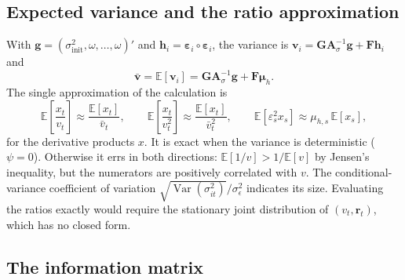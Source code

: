 \documentclass[12pt]{article}
\begin{document}
\subsection{Expected variance and the ratio approximation}\label{sec:ratio-approx}
With $\mathbf g=(\sigma^2_{\mathrm{init}},\omega,\dots,\omega)'$ and $\mathbf h_i=\boldsymbol\varepsilon_i\circ\boldsymbol\varepsilon_i$, the variance is $\mathbf v_i=\mathbf{GA}_\sigma^{-1}\mathbf g+\mathbf F\mathbf h_i$ and
\begin{equation}
\bar{\mathbf v}=\mathbb E[\mathbf v_i]=\mathbf{GA}_\sigma^{-1}\mathbf g+\mathbf F\boldsymbol\mu_h.
\end{equation}
The single approximation of the calculation is
\begin{equation}
\mathbb E\!\left[\frac{x_t}{v_t}\right]\approx\frac{\mathbb E[x_t]}{\bar v_t},\qquad
\mathbb E\!\left[\frac{x_t}{v_t^2}\right]\approx\frac{\mathbb E[x_t]}{\bar v_t^2},\qquad
\mathbb E\!\left[\varepsilon_s^2 x_s\right]\approx\mu_{h,s}\,\mathbb E[x_s],
\label{eq:ratio-approximation}
\end{equation}
for the derivative products $x$. It is exact when the variance is deterministic ($\psi=0$). Otherwise it errs in both directions: $\mathbb E[1/v]>1/\mathbb E[v]$ by Jensen's inequality, but the numerators are positively correlated with $v$. The conditional-variance coefficient of variation $\sqrt{\operatorname{Var}(\sigma^2_{it})}/\sigma_\epsilon^2$ indicates its size. Evaluating the ratios exactly would require the stationary joint distribution of $(v_t,\mathbf r_t)$, which has no closed form.

\subsection{The information matrix}
\end{document}
